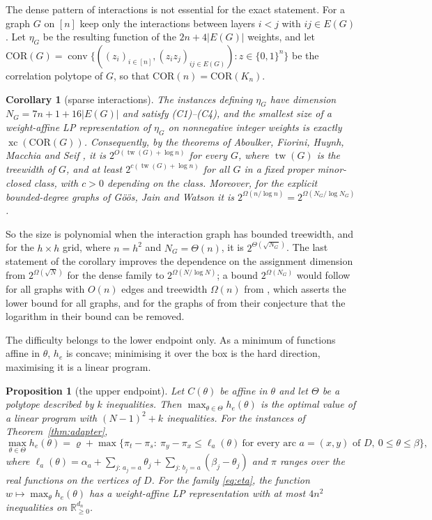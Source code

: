 \documentclass[11pt]{amsart}
\theoremstyle{plain}
\newtheorem{proposition}[theorem]{Proposition}
\newtheorem{corollary}[theorem]{Corollary}
\theoremstyle{definition}
\theoremstyle{remark}
\newcommand{\R}{\mathbb{R}}
\newcommand{\COR}{\mathrm{COR}}
\newcommand{\xc}{\operatorname{xc}}
\begin{document}
The dense pattern of interactions is not essential for the exact statement. For a graph $G$ on $[n]$ keep only the
interactions between layers $i<j$ with $ij\in E(G)$. Let $\eta_G$ be the resulting function of the $2n+4|E(G)|$
weights, and let $\COR(G)=\operatorname{conv}\{((z_i)_{i\in[n]},(z_iz_j)_{ij\in E(G)}):z\in\{0,1\}^n\}$ be the
correlation polytope of $G$, so that $\COR(n)=\COR(K_n)$.

\begin{corollary}[sparse interactions]\label{cor:tw}
The instances defining $\eta_G$ have dimension $N_G=7n+1+16|E(G)|$ and satisfy \textup{(C1)--(C4)}, and the smallest
size of a weight-affine LP representation of $\eta_G$ on nonnegative integer weights is exactly $\xc(\COR(G))$.
Consequently, by the theorems of Aboulker, Fiorini, Huynh, Macchia and Seif \cite{AFHMS}, it is
$2^{O(\operatorname{tw}(G)+\log n)}$ for every $G$, where $\operatorname{tw}(G)$ is the treewidth of $G$, and at
least $2^{c(\operatorname{tw}(G)+\log n)}$ for all $G$ in a fixed proper minor-closed class, with $c>0$ depending
on the class. Moreover, for the explicit bounded-degree graphs of G\"o\"os, Jain and Watson \cite{GJW} it is
$2^{\Omega(n/\log n)}=2^{\Omega(N_G/\log N_G)}$.
\end{corollary}

So the size is polynomial when the interaction graph has bounded treewidth, and for the $h\times h$ grid, where
$n=h^2$ and $N_G=\Theta(n)$, it is $2^{\Theta(\sqrt{N_G})}$. The last statement of the corollary improves the
dependence on the assignment dimension from $2^{\Omega(\sqrt N)}$ for the dense family to $2^{\Omega(N/\log N)}$; a
bound $2^{\Omega(N_G)}$ would follow for all graphs with $O(n)$ edges and treewidth $\Omega(n)$ from
\cite[Conjecture~2]{AFHMS}, which asserts the lower bound for all graphs, and for the graphs of \cite{GJW} from
their conjecture that the logarithm in their bound can be removed.

The difficulty belongs to the lower endpoint only. As a minimum of functions affine in $\theta$, $h_e$ is concave;
minimising it over the box is the hard direction, maximising it is a linear program.

\begin{proposition}[the upper endpoint]\label{prop:upper}
Let $C(\theta)$ be affine in $\theta$ and let $\Theta$ be a polytope described by $k$ inequalities. Then
$\max_{\theta\in\Theta}h_e(\theta)$ is the optimal value of a linear program with $(N-1)^2+k$ inequalities. For the
instances of Theorem~\ref{thm:adapter},
\[
 \max_{\theta\in\Theta}h_e(\theta)=\varrho+\max\bigl\{\pi_t-\pi_s:\ \pi_y-\pi_x\le\ell_a(\theta)\ \text{for every arc }
 a=(x,y)\text{ of }D,\ 0\le\theta\le\beta\bigr\},
\]
where $\ell_a(\theta)=\alpha_a+\sum_{j:\,a_j=a}\theta_j+\sum_{j:\,b_j=a}(\beta_j-\theta_j)$ and $\pi$ ranges over the
real functions on the vertices of $D$. For the family \eqref{eq:eta}, the function
$w\mapsto\max_{\theta}h_e(\theta)$ has a weight-affine LP representation with at most $4n^2$ inequalities on
$\R^{d_n}_{\ge0}$.
\end{proposition}
\end{document}
